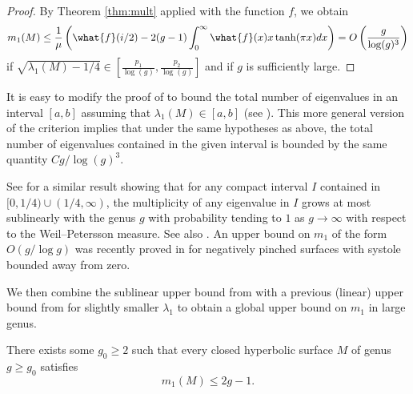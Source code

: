 \documentclass[12pt]{amsart}
\numberwithin{equation}{section}
\begin{document}
\begin{proof}
By Theorem \ref{thm:mult} applied with the function $f$, we obtain
\[
m_1(M) \leq \frac{1}{\mu} \left( \what{f}(i/2) -2(g-1) \int_0^\infty \what{f}(x) x \tanh(\pi x) dx\right) = O\left(\frac{g}{\log(g)^3}\right)
\]
if $\sqrt{\lambda_1(M)-1/4} \in \left[ \frac{p_1}{\log(g)},\frac{p_2}{\log(g)}\right]$ and if $g$ is sufficiently large.
\end{proof}

\begin{rem}
It is easy to modify the proof of  to bound the total number of eigenvalues in an interval $[a,b]$ assuming that $\lambda_1(M)\in [a,b]$ (see \cite[Lemma 3.2]{Klein}). This more general version of the criterion implies that  under the same hypotheses as above, the total number of eigenvalues contained in the given interval is bounded by the same quantity $C g / \log(g)^3$.
\end{rem}

 See \cite[Corollary 1.7]{GLST} for a similar result showing that for any compact interval $I$ contained in $[0,1/4)\cup(1/4,\infty)$, the multiplicity of any eigenvalue in $I$ grows at most sublinearly with the genus $g$ with probability tending to $1$ as $g \to \infty$ with respect to the Weil--Petersson measure. See also \cite[Corollary 6]{Monk}. An upper bound on $m_1$ of the form $O(g/\log g)$ was recently proved in \cite{LetrouitMachado} for negatively pinched surfaces with systole bounded away from zero.

We then combine the sublinear upper bound from  with a previous (linear) upper bound from \cite{Klein} for slightly smaller $\lambda_1$ to obtain a global upper bound on $m_1$ in large genus.

\begin{thm}\label{thm:mult_asymp}
There exists some $g_0 \geq 2$ such that every closed hyperbolic surface $M$ of genus $g\geq g_0$ satisfies
\[
m_1(M) \leq 2g - 1.
\]
\end{thm}
\end{document}
